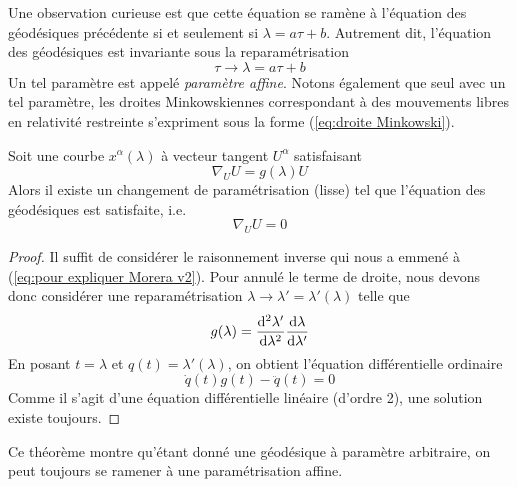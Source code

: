 Une observation curieuse est que cette équation se ramène à l'équation des géodésiques précédente si et seulement si $\lambda = a \tau + b$. Autrement dit, l'équation des géodésiques est invariante sous la reparamétrisation
\begin{equation*}
    \tau \to \lambda = a\tau+b
\end{equation*}
Un tel paramètre est appelé \emph{paramètre affine}. Notons également que seul avec un tel paramètre, les droites Minkowskiennes correspondant à des mouvements libres en relativité restreinte s'expriment sous la forme (\ref{eq:droite Minkowski}).
\begin{theoremframe}
    \begin{theorem}
        Soit une courbe $x^\alpha (\lambda)$ à vecteur tangent $U^\alpha$ satisfaisant 
        \begin{equation}
            \nabla_U U = g(\lambda) U
        \end{equation}
        Alors il existe un changement de paramétrisation (lisse) tel que l'équation des géodésiques est satisfaite, i.e.
    \begin{equation*}
        \nabla_U U = 0
    \end{equation*}
    \end{theorem}
\end{theoremframe}
\begin{proof}
    Il suffit de considérer le raisonnement inverse qui nous a emmené à (\ref{eq:pour expliquer Morera v2}). Pour annulé le terme de droite, nous devons donc considérer une reparamétrisation $\lambda \to \lambda' = \lambda'(\lambda)$ telle que
    \begin{equation}
        g(\lambda) = \frac{\mathrm{d}^2 \lambda'}{\mathrm{d} \lambda^2} \frac{\mathrm{d} \lambda}{\mathrm{d} \lambda'}
    \end{equation}
   En posant $t = \lambda$ et $q(t) = \lambda'(\lambda)$, on obtient l'équation différentielle ordinaire
    \begin{equation}
        \dot{q}(t) g(t) - \ddot{q}(t) = 0
    \end{equation}
    Comme il s'agit d'une équation différentielle linéaire (d'ordre 2), une solution existe toujours.
\end{proof}
Ce théorème montre qu'étant donné une géodésique à paramètre arbitraire, on peut toujours se ramener à une paramétrisation affine.
